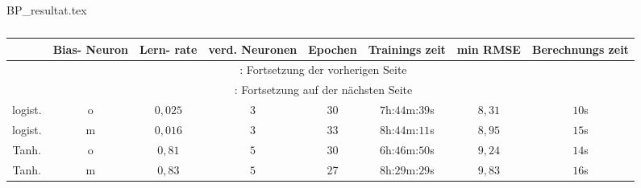 \begin{filecontents*}{BP_resultat.tex}
{
\captionsetup{skip=1pt,margin=5pt,position=below} %

\begin{longtable}{cccccccc}
    \caption{} \label{tab:BP_resultat}\\
    \toprule
    \hiderowcolors

       \multicolumn{1}{Y}{Aktivierungs funktion} &      \multicolumn{1}{Y}{Bias- Neuron} &   \multicolumn{1}{Y}{Lern- rate} &  \multicolumn{1}{Y}{verd. Neuronen} &  \multicolumn{1}{Y}{Epochen} &  \multicolumn{1}{Y}{Trainings zeit} & \multicolumn{1}{Y}{min RMSE}  & \multicolumn{1}{Y}{Berechnungs zeit} \\

    \midrule
    \endfirsthead
        \multicolumn{8}{c}{\footnotesize \tablename\ \thetable{}: Fortsetzung der vorherigen Seite} \\
    \toprule
    \midrule
    \endhead
    \midrule
        \multicolumn{8}{c}{{\footnotesize \tablename\ \thetable{}: Fortsetzung auf der nächsten Seite}} \\
    \bottomrule
    \endfoot
    \bottomrule

        
    \endlastfoot
    \showrowcolors
        logist.                 & o       & $0,025$ & $3$         & 30  & $7$h:$44$m:$39$s & $8,31$ & $10$s         \\
        logist.                 & m       & $0,016$ & $3$         & 33  & $8$h:$44$m:$11$s & $8,95$ & $15$s         \\
        Tanh.                   & o       & $0,81$  & $5$         & 30  & $6$h:$46$m:$50$s & $9,24$ & $14$s         \\
        Tanh.                   & m       & $0,83$  & $5$         & 27  & $8$h:$29$m:$29$s & $9,83$ & $16$s         \\

        
\end{longtable}

}
\end{filecontents*}


\begin{figure}[!htb]
    \centering
    \caption{}
    \label{fig:BP_logis_o_result}
\end{figure}

